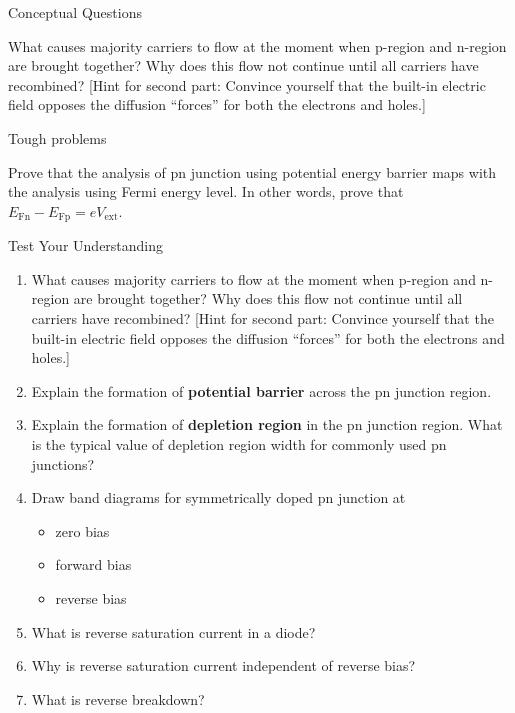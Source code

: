 \begin{frame}[label=pre-M2T1-slot2]{Conceptual Questions}
	\begin{problem}
		What causes majority carriers to flow at the moment when p-region and n-region are brought together? Why does this flow not continue until all carriers have recombined? \hfill [Hint for second part: Convince yourself that the built-in electric field opposes the diffusion ``forces'' for both the electrons and holes.]
	\end{problem}
	\begin{center}
		{\huge Tough problems}
	\end{center}
	\begin{problem}
		Prove that the analysis of pn junction using potential energy barrier maps with the analysis using Fermi energy level. In other words, prove that \(E_\text{Fn} - E_\text{Fp} = e V_\text{ext}\).
	\end{problem}
\end{frame}
%
\begin{frame}[label=pre-M2T1-slot2]{Test Your Understanding}
	\begin{enumerate}
		\item What causes majority carriers to flow at the moment when p-region and n-region are brought together? Why does this flow not continue until all carriers have recombined? \hfill [Hint for second part: Convince yourself that the built-in electric field opposes the diffusion ``forces'' for both the electrons and holes.]
		\item Explain the formation of \textbf{potential barrier} across the pn junction region.
		\item Explain the formation of \textbf{depletion region} in the pn junction region. What is the typical value of depletion region width for commonly used pn junctions?
		\item Draw band diagrams for symmetrically doped pn junction at
		\begin{itemize}
			\item zero bias
			\item forward bias
			\item reverse bias
		\end{itemize}
		\item What is reverse saturation current in a diode?
		\item Why is reverse saturation current independent of reverse bias?
		\item What is reverse breakdown?
	\end{enumerate}
\end{frame}
